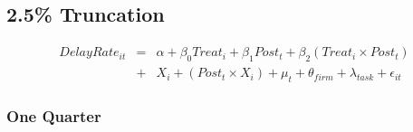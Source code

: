 \documentclass[
]{article}
\begin{document}
\hypertarget{truncation}{%
\subsection{2.5\% Truncation}\label{truncation}}

\[ \begin{aligned} DelayRate_{it} &=& \alpha+\beta_0 Treat_i + \beta_1 Post_t + \beta_2 (Treat_i \times Post_t)\\
&+&  X_i + (Post_t \times X_i) + \mu_t + \theta_{firm} + \lambda_{task}+ \epsilon_{it}
\end{aligned}\]

\hypertarget{one-quarter-2}{%
\subsubsection{One Quarter}\label{one-quarter-2}}
\end{document}
